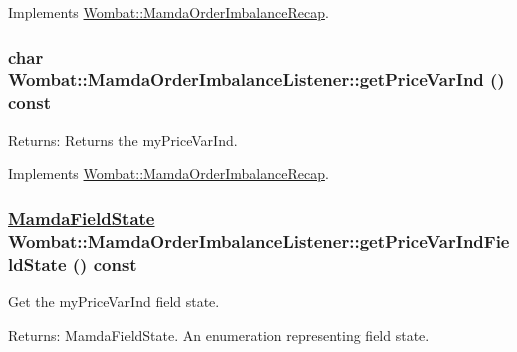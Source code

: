 Implements \hyperlink{classWombat_1_1MamdaOrderImbalanceRecap_51b77c591dfe229e9c977d1c72e93536}{Wombat::Mamda\-Order\-Imbalance\-Recap}.\hypertarget{classWombat_1_1MamdaOrderImbalanceListener_dcb92d290caa24fbf12d5521f5917fe4}{
\subsubsection[getPriceVarInd]{\setlength{\rightskip}{0pt plus 5cm}char Wombat::Mamda\-Order\-Imbalance\-Listener::get\-Price\-Var\-Ind () const}}
\label{classWombat_1_1MamdaOrderImbalanceListener_dcb92d290caa24fbf12d5521f5917fe4}


\begin{Desc}
\item[Returns:]Returns the my\-Price\-Var\-Ind. \end{Desc}


Implements \hyperlink{classWombat_1_1MamdaOrderImbalanceRecap_3aa9b6bbac27f9e29b8a1b9b43b11258}{Wombat::Mamda\-Order\-Imbalance\-Recap}.\hypertarget{classWombat_1_1MamdaOrderImbalanceListener_b59ba04652f3f591eab16bd569caa711}{
\subsubsection[getPriceVarIndFieldState]{\setlength{\rightskip}{0pt plus 5cm}\hyperlink{namespaceWombat_93aac974f2ab713554fd12a1fa3b7d2a}{Mamda\-Field\-State} Wombat::Mamda\-Order\-Imbalance\-Listener::get\-Price\-Var\-Ind\-Field\-State () const}}
\label{classWombat_1_1MamdaOrderImbalanceListener_b59ba04652f3f591eab16bd569caa711}


Get the my\-Price\-Var\-Ind field state. 

\begin{Desc}
\item[Returns:]Mamda\-Field\-State. An enumeration representing field state. \end{Desc}


